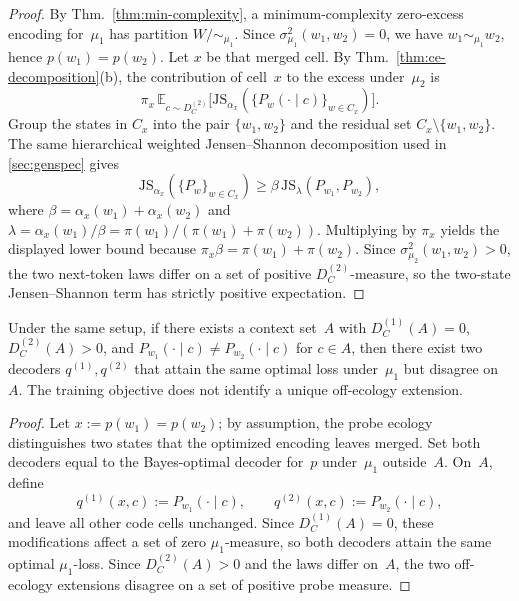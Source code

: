 \documentclass[twoside,11pt]{article}
\newcommand{\sigmasq}{\sigma^2}
\newcommand{\E}{\mathbb{E}}
\newcommand{\JS}{\mathrm{JS}}
\newcommand{\thmref}[1]{Thm.~\ref{#1}}
\begin{document}
\begin{proof}
By \thmref{thm:min-complexity}, a minimum-complexity zero-excess encoding for~$\mu_1$ has partition $W/{\sim_{\mu_1}}$. Since $\sigmasq_{\mu_1}(w_1,w_2)=0$, we have $w_1\sim_{\mu_1}w_2$, hence $p(w_1)=p(w_2)$. Let $x$ be that merged cell. By \thmref{thm:ce-decomposition}(b), the contribution of cell~$x$ to the excess under~$\mu_2$ is
\[
\pi_x\, \E_{c\sim D_C^{(2)}}
\bigl[\JS_{\alpha_x}
(\{P_w(\cdot\mid c)\}_{w\in C_x})\bigr].
\]
Group the states in $C_x$ into the pair $\{w_1,w_2\}$ and the residual set $C_x\setminus\{w_1,w_2\}$. The same hierarchical weighted Jensen--Shannon decomposition used in \cref{sec:genspec} gives
\[
\JS_{\alpha_x}(\{P_w\}_{w\in C_x})
\ge \beta\,\JS_{\lambda}(P_{w_1},P_{w_2}),
\]
where $\beta=\alpha_x(w_1)+\alpha_x(w_2)$ and $\lambda=\alpha_x(w_1)/\beta=\pi(w_1)/(\pi(w_1)+\pi(w_2))$. Multiplying by $\pi_x$ yields the displayed lower bound because $\pi_x\beta=\pi(w_1)+\pi(w_2)$. Since $\sigmasq_{\mu_2}(w_1,w_2)>0$, the two next-token laws differ on a set of positive $D_C^{(2)}$-measure, so the two-state Jensen--Shannon term has strictly positive expectation.
\end{proof}

\begin{proposition}\label{prop:off-ecology-nonident}
Under the same setup, if there exists a context set~$A$ with $D_C^{(1)}(A)=0$, $D_C^{(2)}(A)>0$, and $P_{w_1}(\cdot\mid c)\neq P_{w_2}(\cdot\mid c)$ for $c\in A$, then there exist two decoders $q^{(1)},q^{(2)}$ that attain the same optimal loss under~$\mu_1$ but disagree on~$A$. The training objective does not identify a unique off-ecology extension.
\end{proposition}

\begin{proof}
Let $x:=p(w_1)=p(w_2)$; by assumption, the probe ecology distinguishes two states that the optimized encoding leaves merged. Set both decoders equal to the Bayes-optimal decoder for~$p$ under~$\mu_1$ outside~$A$. On~$A$, define
\[
q^{(1)}(x,c):=P_{w_1}(\cdot\mid c),
\qquad
q^{(2)}(x,c):=P_{w_2}(\cdot\mid c),
\]
and leave all other code cells unchanged. Since $D_C^{(1)}(A)=0$, these modifications affect a set of zero $\mu_1$-measure, so both decoders attain the same optimal $\mu_1$-loss. Since $D_C^{(2)}(A)>0$ and the laws differ on~$A$, the two off-ecology extensions disagree on a set of positive probe measure.
\end{proof}

\end{document}
